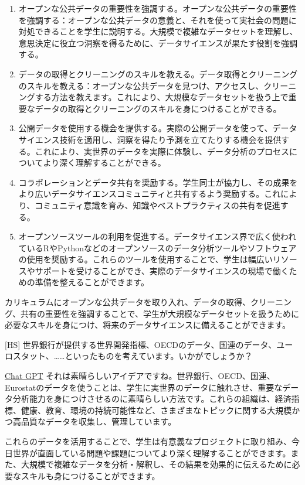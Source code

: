 \documentclass[
]{bxjsbook}
\theoremstyle{definition}
\theoremstyle{definition}
\theoremstyle{definition}
\theoremstyle{definition}
\theoremstyle{remark}
\begin{document}
\begin{enumerate}
\def\labelenumi{\arabic{enumi}.}
\item
  オープンな公共データの重要性を強調する。オープンな公共データの重要性を強調する：オープンな公共データの意義と、それを使って実社会の問題に対処できることを学生に説明する。大規模で複雑なデータセットを理解し、意思決定に役立つ洞察を得るために、データサイエンスが果たす役割を強調する。
\item
  データの取得とクリーニングのスキルを教える。データ取得とクリーニングのスキルを教える：オープンな公共データを見つけ、アクセスし、クリーニングする方法を教えます。これにより、大規模なデータセットを扱う上で重要なデータの取得とクリーニングのスキルを身につけることができる。
\item
  公開データを使用する機会を提供する。実際の公開データを使って、データサイエンス技術を適用し、洞察を得たり予測を立てたりする機会を提供する。これにより、実世界のデータを実際に体験し、データ分析のプロセスについてより深く理解することができる。
\item
  コラボレーションとデータ共有を奨励する。学生同士が協力し、その成果をより広いデータサイエンスコミュニティと共有するよう奨励する。これにより、コミュニティ意識を育み、知識やベストプラクティスの共有を促進する。
\item
  オープンソースツールの利用を促進する。データサイエンス界で広く使われているRやPythonなどのオープンソースのデータ分析ツールやソフトウェアの使用を奨励する。これらのツールを使用することで、学生は幅広いリソースやサポートを受けることができ、実際のデータサイエンスの現場で働くための準備を整えることができます。
\end{enumerate}

カリキュラムにオープンな公共データを取り入れ、データの取得、クリーニング、共有の重要性を強調することで、学生が大規模なデータセットを扱うために必要なスキルを身につけ、将来のデータサイエンスに備えることができます。

{[}HS{]} 世界銀行が提供する世界開発指標、OECDのデータ、国連のデータ、ユーロスタット、\ldots\ldots といったものを考えています。いかがでしょうか？

\protect\hyperlink{chatgpt}{Chat GPT} それは素晴らしいアイデアですね。世界銀行、OECD、国連、Eurostatのデータを使うことは、学生に実世界のデータに触れさせ、重要なデータ分析能力を身につけさせるのに素晴らしい方法です。これらの組織は、経済指標、健康、教育、環境の持続可能性など、さまざまなトピックに関する大規模かつ高品質なデータを収集し、管理しています。

これらのデータを活用することで、学生は有意義なプロジェクトに取り組み、今日世界が直面している問題や課題についてより深く理解することができます。また、大規模で複雑なデータを分析・解釈し、その結果を効果的に伝えるために必要なスキルも身につけることができます。
\end{document}
